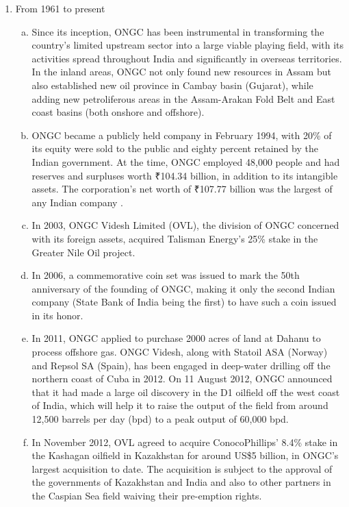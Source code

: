 \begin{enumerate}
\begin{enumerate}[(a)]
\end{enumerate}


\item From 1961 to present

\begin{enumerate}[(a)]

\item Since its inception, ONGC has been instrumental in transforming the country's limited upstream sector into a large viable playing field, with its activities spread throughout India and significantly in overseas territories. In the inland areas, ONGC not only found new resources in Assam but also established new oil province in Cambay basin (Gujarat), while adding new petroliferous areas in the Assam-Arakan Fold Belt and East coast basins (both onshore and offshore).

\item ONGC became a publicly held company in February 1994, with 20\% of its equity were sold to the public and eighty percent retained by the Indian government. At the time, ONGC employed 48,000 people and had reserves and surpluses worth ₹104.34 billion, in addition to its intangible assets. The corporation's net worth of ₹107.77 billion was the largest of any Indian company .

\item In 2003, ONGC Videsh Limited (OVL), the division of ONGC concerned with its foreign assets, acquired Talisman Energy's 25\% stake in the Greater Nile Oil project.

\item In 2006, a commemorative coin set was issued to mark the 50th anniversary of the founding of ONGC, making it only the second Indian company (State Bank of India being the first) to have such a coin issued in its honor.

\item In 2011, ONGC applied to purchase 2000 acres of land at Dahanu to process offshore gas. ONGC Videsh, along with Statoil ASA (Norway) and Repsol SA (Spain), has been engaged in deep-water drilling off the northern coast of Cuba in 2012. On 11 August 2012, ONGC announced that it had made a large oil discovery in the D1 oilfield off the west coast of India, which will help it to raise the output of the field from around 12,500 barrels per day (bpd) to a peak output of 60,000 bpd.

\item In November 2012, OVL agreed to acquire ConocoPhillips' 8.4\% stake in the Kashagan oilfield in Kazakhstan for around US\$5 billion, in ONGC's largest acquisition to date. The acquisition is subject to the approval of the governments of Kazakhstan and India and also to other partners in the Caspian Sea field waiving their pre-emption rights.


\end{enumerate}
\end{enumerate}
